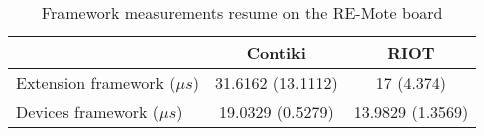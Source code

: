 \begin{table}[!ht]
  \centering
  \begin{tabular}{l|c|c}
                      & Contiki           & RIOT             \\ \hline
  Extension framework ($\mu s$) & 31.6162 (13.1112) & 17 (4.374)       \\
  Devices framework ($\mu s$)   & 19.0329 (0.5279)  & 13.9829 (1.3569)
  \end{tabular}
  \caption{Framework measurements resume on the RE-Mote board}
  \label{tab:framework-measurements-resume-remote}
  \end{table}